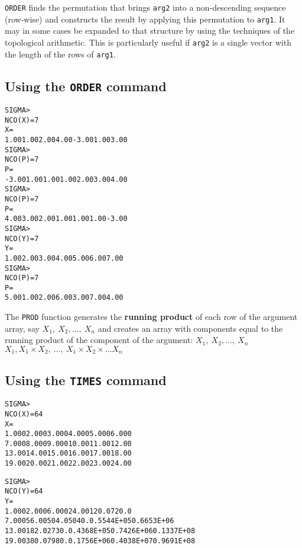 \texttt{ORDER} finds the permutation that
brings \texttt{arg2} into a non-descending sequence
(row-wise) and constructs the result by applying 
this permutation to \texttt{arg1}. 
It may in some cases be expanded to that structure by 
using the techniques of the topological arithmetic. 
This is particularly useful if \texttt{arg2} is
a single vector with the length of the rows of \texttt{arg1}.

\subsection*{Using the \texttt{ORDER} command}
\begin{alltt}
 SIGMA > 
 NCO(X       )=    7
 X       =
   1.00      1.00      2.00      4.00     -3.00      1.00      3.00
 SIGMA > 
 NCO(P       )=    7
 P       =
  -3.00      1.00      1.00      1.00      2.00      3.00      4.00
 SIGMA > 
 NCO(P       )=    7
 P       =
   4.00      3.00      2.00      1.00      1.00      1.00     -3.00
 SIGMA > 
 NCO(Y       )=    7
 Y       =
   1.00      2.00      3.00      4.00      5.00      6.00      7.00
 SIGMA > 
 NCO(P       )=    7
 P       =
   5.00      1.00      2.00      6.00      3.00      7.00      4.00
\end{alltt}

 
The \texttt{PROD} function generates the {\bf running product}
of each row of the argument
array, say \( X_1,\: X_2,\ldots,\:X_n \)
and creates an array with components equal to the
running product of the component of the argument:
\( X_1,\: X_2,\ldots,\:X_n \)
\(X_1 ,X_1 \times X_2 ,\: \ldots, \: X_1 \times X_2 \times \ldots X_n \)

\subsection*{Using the \texttt{TIMES} command}
\begin{alltt}
  SIGMA > 
  NCO(X       )=    6    4
  X       =
    1.000      2.000      3.000      4.000      5.000      6.000
    7.000      8.000      9.000      10.00      11.00      12.00
    13.00      14.00      15.00      16.00      17.00      18.00
    19.00      20.00      21.00      22.00      23.00      24.00
 
  SIGMA > 
  NCO(Y       )=    6    4
  Y       =
    1.000      2.000      6.000      24.00      120.0      720.0
    7.000      56.00      504.0      5040.     0.5544E+05 0.6653E+06
    13.00      182.0      2730.     0.4368E+05 0.7426E+06 0.1337E+08
    19.00      380.0      7980.     0.1756E+06 0.4038E+07 0.9691E+08
\end{alltt}

